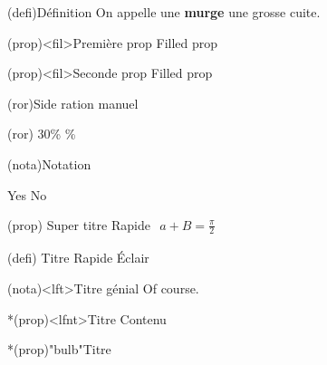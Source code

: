 \documentclass[a4paper, 10pt, garamond]{book}
\begin{document}
\begin{tcb}(defi){Définition}
	On appelle une \textbf{murge} une grosse cuite.
\end{tcb}

\begin{tcb*}(prop)<fil>{Première prop}
	Filled prop
\end{tcb*}

\begin{tcb}(prop)<fil>{Seconde prop}
	Filled prop
\end{tcb}

\begin{tcb}(ror){Side ration manuel}
	\lipsum[1]
	\smallbreak
	\begin{isd}[righthand ratio=.7](ror)
		30\%
		\%
	\end{isd}
\end{tcb}

\begin{tcb*}(nota){Notation}
	\lipsum[1]
	\begin{isd}[cnt]
		Yes
		\tcblower
		No
	\end{isd}
	\lipsum[2]
\end{tcb*}

\sde[right](prop)
{Super titre}{
	Rapide
}{
	$
		\begin{gathered}
			a + B = \frac{\pi}{2}
		\end{gathered}
	$
}


(defi)
{Titre}{
	Rapide
}{
	Éclair
}

\sde[right, ](nota)<lft>{Titre génial}{
	\lipsum[2]
}{
	Of course.
}

\begin{tcb}*(prop)<lfnt>{Titre}
	Contenu
\end{tcb}

\begin{tcb}*(prop)"bulb"{Titre}

\end{tcb}
\end{document}
